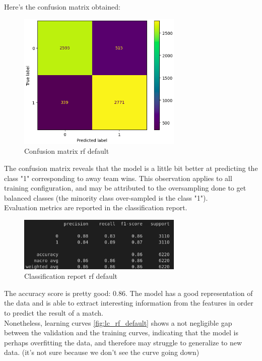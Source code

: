 \documentclass[a4paper,12pt]{article}
\begin{document}
Here's the confusion matrix obtained:

\begin{figure}[H]
  \centering
  \includegraphics[width=0.7\textwidth]{./images/cm_rf_default.png}
  \caption{Confusion matrix rf default}
  \label{fig:cm_rf_default}
\end{figure}

The confusion matrix reveals that the model is a little bit better at predicting the class "1" corresponding to away team wins. This observation applies to all training configuration, and may be attributed to the oversampling done to get balanced classes (the minority class over-sampled is the class "1").\\

Evaluation metrics are reported in the classification report.

\begin{figure}[H]
  \centering
  \includegraphics[width=0.7\textwidth]{./images/report_rf_default.png}
  \caption{Classification report rf default}
  \label{fig:report_rf_default}
\end{figure}

The accuracy score is pretty good: 0.86. The model has a good representation of the data and is able to extract interesting information from the features in order to predict the result of a match.\\

Nonetheless, learning curves \ref{fig:lc_rf_default} shows a not negligible gap between the validation and the training curves, indicating that the model is perhaps overfitting the data, and therefore may struggle to generalize to new data. (it's not sure because we don't see the curve going down)
\end{document}
